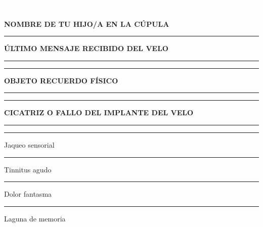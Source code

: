 \documentclass[10pt,a4paper,oneside]{book}
\newcommand{\rulefield}[2][\linewidth]{%
  \begin{minipage}[t]{#1}
  \textcolor{InkSoft}{\industrialfont\scriptsize\bfseries\MakeUppercase{#2}}\par
  \vspace{0.8mm}\textcolor{Line}{\rule{\linewidth}{0.45pt}}
  \end{minipage}}
\newcommand{\strip}[1]{%
  \vspace{0.8mm}\noindent
  \colorbox{CarbonDark}{\parbox{\dimexpr\linewidth-2\fboxsep\relax}{%
    \textcolor{white}{\industrialfont\bfseries\small\MakeUppercase{#1}}}}\par
  \vspace{0.8mm}}
\newcommand{\checkline}[2]{%
  \textcolor{#1}{\rule{2.4mm}{2.4mm}}\hspace{1mm}\textcolor{InkSoft}{\scriptsize #2}}
\begin{document}
\begin{minipage}[t]{0.48\linewidth}
  \strip{02 // El juramento del linaje}
  \begin{tcolorbox}[enhanced,colback=BluePale,colframe=BurdinUrdin,boxrule=.6pt,
    arc=0.8mm,left=4pt,right=4pt,top=2.5pt,bottom=2.5pt,height=44mm]
    \scriptsize
    \rulefield{Nombre de tu hijo/a en la Cúpula}\par\vspace{1mm}
    \rulefield{Último mensaje recibido del Velo}\par\vspace{1mm}
    \textcolor{Line}{\rule{\linewidth}{.4pt}}\par\vspace{1mm}
    \rulefield{Objeto recuerdo físico}\par\vspace{1mm}
    \textcolor{Line}{\rule{\linewidth}{.4pt}}\par\vspace{1mm}
    \rulefield{Cicatriz o fallo del implante del Velo}\par\vspace{1mm}
    \checkline{BurdinUrdin}{Jaqueo sensorial}\hfill
    \checkline{BurdinUrdin}{Tinnitus agudo}\par\vspace{0.8mm}
    \checkline{BurdinUrdin}{Dolor fantasma}\hfill
    \checkline{BurdinUrdin}{Laguna de memoria}
  \end{tcolorbox}
\end{minipage}\hfill
\end{document}
